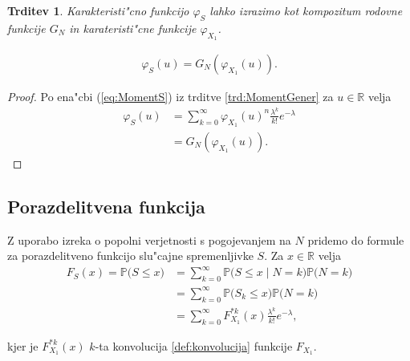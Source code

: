 \documentclass[12pt, a4paper, reqno]{amsart}
\theoremstyle{definition}
\theoremstyle{plain}
\newtheorem{trditev}[definicija]{Trditev}
\newcommand{\R}{\mathbb{R}}
\newcommand{\Prob}{\mathbb{P}}
\newcommand{\1}{\mathds{1}}
\newcommand*{\refPriloga}[1]{%
  \begingroup
    \hypersetup{
      linkcolor=red,
      linkbordercolor=red,
    }%
    \ref{#1}%
  \endgroup
}
\begin{document}
    \begin{trditev}
        Karakteristi"cno funkcijo $\varphi_S$ lahko izrazimo kot kompozitum rodovne funkcije $G_N$ in 
        karateristi"cne funkcije $\varphi_{X_1}$.

        \begin{align*}
            \varphi_{S}(u) = G_{N}\left(\varphi_{X_1}(u)\right).
        \end{align*}

        \label{lema:povezavaRodovneKarkateristicne}
    \end{trditev}

    \begin{proof}
        Po ena"cbi (\ref{eq:MomentS}) iz trditve \ref{trd:MomentGener} za $u\in\R$ velja
        \begin{align*}
            \varphi_{S}(u) &= \sum_{k=0}^{\infty}
            \varphi_{X_1}(u)^n\frac{\lambda^k}{k!}e^{-\lambda} \\
            &= G_{N}\left(\varphi_{X_1}(u)\right).
        \end{align*}
    \end{proof}

    \subsection{Porazdelitvena funkcija}
    Z uporabo izreka o popolni verjetnosti s pogojevanjem na $N$ pridemo do formule za 
    porazdelitveno funkcijo slu"cajne spremenljivke $S$. Za $x \in \R$ velja 
    \begin{align*}
        F_{S}(x) = \Prob\bigl(S \leq x\bigr) 
        &= \sum_{k=0}^\infty \Prob\bigl(S \leq x \mid N = k\bigr)\Prob\bigl(N = k\bigr) \\
        &= \sum_{k=0}^\infty \Prob\bigl(S_k \leq x\bigr)\Prob\bigl(N = k\bigr) \\
        &= \sum_{k=0}^\infty F_{X_1}^{*k}(x) \frac{\lambda^k}{k!} e^{-\lambda},
    \end{align*}

    \noindent
    kjer je $F_{X_1}^{*k}(x)$  $k$-ta konvolucija \refPriloga{def:konvolucija} funkcije $F_{X_1}$.
    
\end{document}
